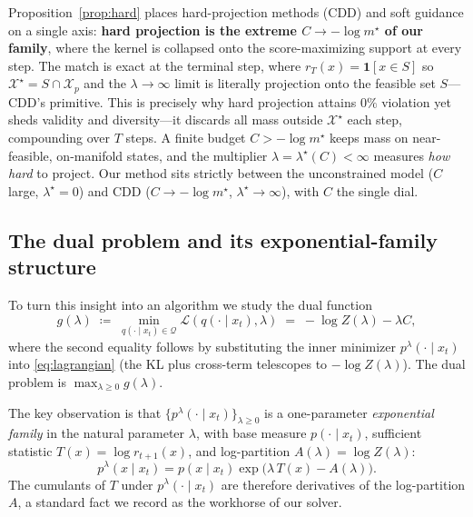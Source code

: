 \documentclass{article}
\newcommand{\X}{\mathcal{X}}
\newcommand{\Q}{\mathcal{Q}}
\newcommand{\lstar}{\lambda^{\star}}
\newcommand{\qlam}{p^{\lambda}(\cdot\mid x_t)}
\begin{document}
Proposition~\ref{prop:hard} places hard-projection methods (CDD) and soft guidance on a single axis: \textbf{hard projection is the extreme $C\to-\log m^\star$ of our family}, where the kernel is collapsed onto the score-maximizing support at every step. The match is exact at the terminal step, where $r_T(x)=\mathbf 1[x\in S]$ so $\X^\star=S\cap\X_p$ and the $\lambda\to\infty$ limit is literally projection onto the feasible set $S$---CDD's primitive. This is precisely why hard projection attains $0\%$ violation yet sheds validity and diversity---it discards all mass outside $\X^\star$ each step, compounding over $T$ steps. A finite budget $C>-\log m^\star$ keeps mass on near-feasible, on-manifold states, and the multiplier $\lambda=\lstar(C)<\infty$ measures \emph{how hard} to project. Our method sits strictly between the unconstrained model ($C$ large, $\lstar=0$) and CDD ($C\to-\log m^\star$, $\lstar\to\infty$), with $C$ the single dial.

\subsection{The dual problem and its exponential-family structure}
To turn this insight into an algorithm we study the dual function
\begin{equation}
\label{eq:dual}
g(\lambda)\;\coloneqq\;\min_{q(\cdot\mid x_t)\in\Q}\mathcal L(q(\cdot\mid x_t),\lambda)
\;=\;-\log Z(\lambda)-\lambda C,
\end{equation}
where the second equality follows by substituting the inner minimizer $\qlam$ into \eqref{eq:lagrangian} (the KL plus cross-term telescopes to $-\log Z(\lambda)$). The dual problem is $\max_{\lambda\ge 0} g(\lambda)$.

The key observation is that $\{\qlam\}_{\lambda\ge0}$ is a one-parameter \emph{exponential family} in the natural parameter $\lambda$, with base measure $p(\cdot\mid x_t)$, sufficient statistic $T(x)=\log r_{t+1}(x)$, and log-partition $A(\lambda)=\log Z(\lambda)$:
\begin{equation}
p^{\lambda}(x\mid x_t)=p(x\mid x_t)\exp\!\big(\lambda\,T(x)-A(\lambda)\big).
\end{equation}
The cumulants of $T$ under $\qlam$ are therefore derivatives of the log-partition $A$, a standard fact we record as the workhorse of our solver.
\end{document}
